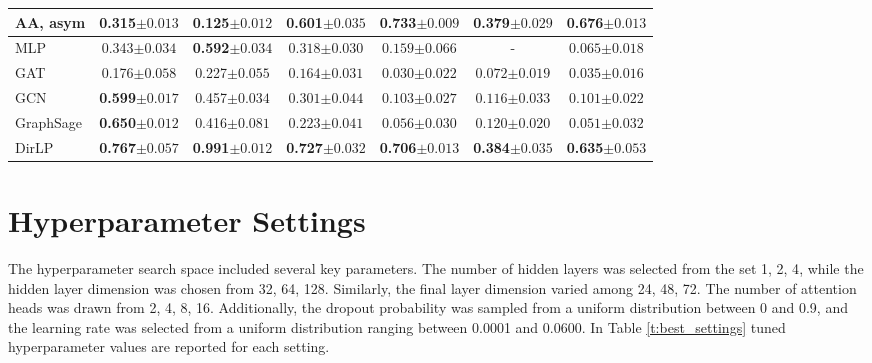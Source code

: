 \documentclass{article}
\newcommand{\firstbest}[1]{\textbf{\textcolor{junscolor1}{#1}}}
\newcommand{\secondbest}[1]{\textbf{\textcolor{junscolor2}{#1}}}
\newcommand{\thirdbest}[1]{\textbf{\textcolor{junscolor3}{#1}}}
\begin{document}
\begin{table}[htbp]
\begin{center}
\begin{tabular}{l c c c c c c}
AA, asym	& 0.315${\scriptstyle\pm0.013}$ & 0.125${\scriptstyle\pm0.012}$
&  \thirdbest{0.601${\scriptstyle\pm0.035}$} &  \secondbest{0.733${\scriptstyle\pm0.009}$} &  \secondbest{0.379${\scriptstyle\pm0.029}$} & \secondbest{0.676${\scriptstyle\pm0.013}$} \\
\hline
MLP	& 0.343${\scriptstyle\pm0.034}$ & \secondbest{0.592${\scriptstyle\pm0.034}$}
&  $0.318{\scriptstyle\pm0.030}$ &  $0.159{\scriptstyle\pm0.066}$ &  - &  $0.065{\scriptstyle\pm0.018}$ \\
GAT	& 0.176${\scriptstyle\pm0.058}$ & 0.227${\scriptstyle\pm0.055}$
&  $0.164{\scriptstyle\pm0.031}$ &  $0.030{\scriptstyle\pm0.022}$ &  $0.072{\scriptstyle\pm0.019}$ &  $0.035{\scriptstyle\pm0.016}$ \\
GCN	& \thirdbest{0.599${\scriptstyle\pm0.017}$} & 0.457${\scriptstyle\pm0.034}$
&  $0.301{\scriptstyle\pm0.044}$ &  $0.103{\scriptstyle\pm0.027}$ &  $0.116{\scriptstyle\pm0.033}$ &  $0.101{\scriptstyle\pm0.022}$ \\
GraphSage	& \secondbest{0.650${\scriptstyle\pm0.012}$} & 0.416${\scriptstyle\pm0.081}$
&  $0.223{\scriptstyle\pm0.041}$ &  $0.056{\scriptstyle\pm0.030}$ &  $0.120{\scriptstyle\pm0.020}$ &  $0.051{\scriptstyle\pm0.032}$ \\
\hline
DirLP	& \firstbest{0.767${\scriptstyle\pm0.057}$} & \firstbest{0.991${\scriptstyle\pm0.012}$}
&  \firstbest{0.727${\scriptstyle\pm0.032}$} &  \thirdbest{0.706${\scriptstyle\pm0.013}$} &  \firstbest{0.384${\scriptstyle\pm0.035}$} &  \thirdbest{0.635${\scriptstyle\pm0.053}$}
\end{tabular}

\end{center}
\end{table}

\newpage
\section{Hyperparameter Settings}\label{app:hyperparameter}
The hyperparameter search space included several key parameters. The number of hidden layers was selected from the set {1, 2, 4}, while the hidden layer dimension was chosen from {32, 64, 128}. Similarly, the final layer dimension varied among {24, 48, 72}. The number of attention heads was drawn from {2, 4, 8, 16}. Additionally, the dropout probability was sampled from a uniform distribution between 0 and 0.9, and the learning rate was selected from a uniform distribution ranging between 0.0001 and 0.0600. In Table \ref{t:best_settings} tuned hyperparameter values are reported for each setting. 
\end{document}

